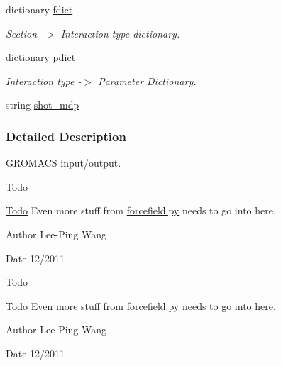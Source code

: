 \begin{DoxyCompactItemize}
dictionary \hyperlink{namespaceforcebalance_1_1gmxio_a179cbde2e55b4c025af89b225612d6e1}{fdict}
\begin{DoxyCompactList}\small\item\em Section -\/$>$ Interaction type dictionary. \end{DoxyCompactList}\item 
dictionary \hyperlink{namespaceforcebalance_1_1gmxio_ae845e0b923ecde16c79f2742b94534a6}{pdict}
\begin{DoxyCompactList}\small\item\em Interaction type -\/$>$ Parameter Dictionary. \end{DoxyCompactList}\item 
string \hyperlink{namespaceforcebalance_1_1gmxio_a35d747dea4a5446d049d901e782feaa2}{shot\-\_\-mdp}
\end{DoxyCompactItemize}


\subsubsection{Detailed Description}
G\-R\-O\-M\-A\-C\-S input/output. \begin{DoxyRefDesc}{Todo}
\item[\hyperlink{todo__todo000009}{Todo}]Even more stuff from \hyperlink{forcefield_8py}{forcefield.\-py} needs to go into here.\end{DoxyRefDesc}


\begin{DoxyAuthor}{Author}
Lee-\/\-Ping Wang 
\end{DoxyAuthor}
\begin{DoxyDate}{Date}
12/2011
\end{DoxyDate}
\begin{DoxyRefDesc}{Todo}
\item[\hyperlink{todo__todo000012}{Todo}]Even more stuff from \hyperlink{forcefield_8py}{forcefield.\-py} needs to go into here.\end{DoxyRefDesc}


\begin{DoxyAuthor}{Author}
Lee-\/\-Ping Wang 
\end{DoxyAuthor}
\begin{DoxyDate}{Date}
12/2011 
\end{DoxyDate}


